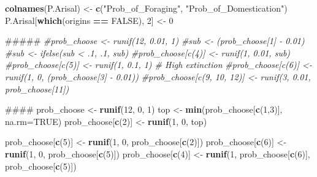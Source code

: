 \documentclass[]{book}
\newenvironment{Shaded}{\begin{snugshade}}{\end{snugshade}}
\newcommand{\KeywordTok}[1]{\textcolor[rgb]{0.13,0.29,0.53}{\textbf{{#1}}}}
\newcommand{\DataTypeTok}[1]{\textcolor[rgb]{0.13,0.29,0.53}{{#1}}}
\newcommand{\DecValTok}[1]{\textcolor[rgb]{0.00,0.00,0.81}{{#1}}}
\newcommand{\StringTok}[1]{\textcolor[rgb]{0.31,0.60,0.02}{{#1}}}
\newcommand{\CommentTok}[1]{\textcolor[rgb]{0.56,0.35,0.01}{\textit{{#1}}}}
\newcommand{\OtherTok}[1]{\textcolor[rgb]{0.56,0.35,0.01}{{#1}}}
\newcommand{\OperatorTok}[1]{\textcolor[rgb]{0.81,0.36,0.00}{\textbf{{#1}}}}
\newcommand{\NormalTok}[1]{{#1}}
\theoremstyle{definition}
\theoremstyle{definition}
\theoremstyle{remark}
\begin{document}
\begin{Shaded}
\begin{Highlighting}[]
    \KeywordTok{colnames}\NormalTok{(P.Arisal) <-}\StringTok{ }\KeywordTok{c}\NormalTok{(}\StringTok{"Prob_of_Foraging"}\NormalTok{, }\StringTok{"Prob_of_Domestication"}\NormalTok{)}
\NormalTok{    P.Arisal[}\KeywordTok{which}\NormalTok{(origins }\OperatorTok{==}\StringTok{ }\OtherTok{FALSE}\NormalTok{), }\DecValTok{2}\NormalTok{]  <-}\StringTok{ }\DecValTok{0}
    
\NormalTok{    #####}
    \CommentTok{#prob_choose <- runif(12, 0.01, 1)}
    \CommentTok{#sub <- (prob_choose[1] - 0.01)}
    \CommentTok{#sub <- ifelse(sub < .1, .1, sub)}
    \CommentTok{#prob_choose[c(4)] <- runif(1, 0.01, sub)}
    \CommentTok{#prob_choose[c(5)] <- runif(1, 0.1, 1) # High extinction}
    \CommentTok{#prob_choose[c(6)] <- runif(1, 0, (prob_choose[3] - 0.01))}
    \CommentTok{#prob_choose[c(9, 10, 12)] <- runif(3, 0.01, prob_choose[11])}
    
\NormalTok{    ####}
\NormalTok{    prob_choose <-}\StringTok{ }\KeywordTok{runif}\NormalTok{(}\DecValTok{12}\NormalTok{, }\DecValTok{0}\NormalTok{, }\DecValTok{1}\NormalTok{)}
\NormalTok{    top <-}\StringTok{ }\KeywordTok{min}\NormalTok{(prob_choose[}\KeywordTok{c}\NormalTok{(}\DecValTok{1}\NormalTok{,}\DecValTok{3}\NormalTok{)], }\DataTypeTok{na.rm=}\OtherTok{TRUE}\NormalTok{)}
\NormalTok{    prob_choose[}\KeywordTok{c}\NormalTok{(}\DecValTok{2}\NormalTok{)] <-}\StringTok{ }\KeywordTok{runif}\NormalTok{(}\DecValTok{1}\NormalTok{, }\DecValTok{0}\NormalTok{, top)}
    
\NormalTok{    prob_choose[}\KeywordTok{c}\NormalTok{(}\DecValTok{5}\NormalTok{)] <-}\StringTok{ }\KeywordTok{runif}\NormalTok{(}\DecValTok{1}\NormalTok{, }\DecValTok{0}\NormalTok{, prob_choose[}\KeywordTok{c}\NormalTok{(}\DecValTok{2}\NormalTok{)]) }
\NormalTok{    prob_choose[}\KeywordTok{c}\NormalTok{(}\DecValTok{6}\NormalTok{)] <-}\StringTok{ }\KeywordTok{runif}\NormalTok{(}\DecValTok{1}\NormalTok{, }\DecValTok{0}\NormalTok{, prob_choose[}\KeywordTok{c}\NormalTok{(}\DecValTok{5}\NormalTok{)])}
\NormalTok{    prob_choose[}\KeywordTok{c}\NormalTok{(}\DecValTok{4}\NormalTok{)] <-}\StringTok{ }\KeywordTok{runif}\NormalTok{(}\DecValTok{1}\NormalTok{, prob_choose[}\KeywordTok{c}\NormalTok{(}\DecValTok{6}\NormalTok{)], prob_choose[}\KeywordTok{c}\NormalTok{(}\DecValTok{5}\NormalTok{)])}
    

\end{Highlighting}
\end{Shaded}
\end{document}
